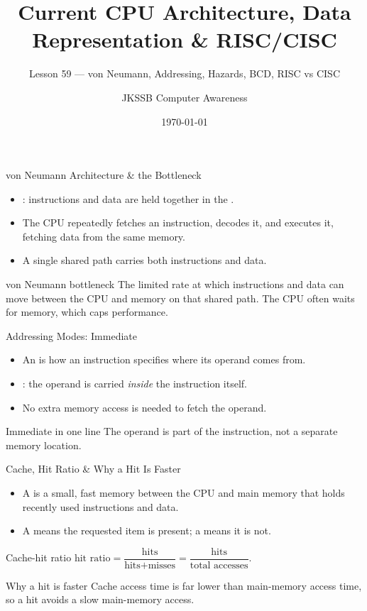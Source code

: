 \documentclass[aspectratio=169]{beamer}
\title{Current CPU Architecture, Data Representation \& RISC/CISC}
\subtitle{Lesson 59 --- von Neumann, Addressing, Hazards, BCD, RISC vs CISC}
\author{JKSSB Computer Awareness}
\date{\today}
\begin{document}
\frame{\titlepage}

\begin{frame}{von Neumann Architecture \& the Bottleneck}
  \begin{itemize}
    \item {}: instructions and
      data are held together in the .
    \item The CPU repeatedly fetches an instruction, decodes it, and executes
      it, fetching data from the same memory.
    \item A single shared path carries both instructions and data.
  \end{itemize}
  \begin{alertblock}{von Neumann bottleneck}
    The limited rate at which instructions and data can move between the CPU
    and memory on that shared path. The CPU often waits for memory, which
    caps performance.
  \end{alertblock}
\end{frame}

\begin{frame}{Addressing Modes: Immediate}
  \begin{itemize}
    \item An  is how an instruction specifies where its
      operand comes from.
    \item {}: the operand is carried \emph{inside}
      the instruction itself.
    \item No extra memory access is needed to fetch the operand.
  \end{itemize}
  \begin{block}{Immediate in one line}
    The operand is part of the instruction, not a separate memory location.
  \end{block}
\end{frame}

\begin{frame}{Cache, Hit Ratio \& Why a Hit Is Faster}
  \begin{itemize}
    \item A  is a small, fast memory between the CPU and main
      memory that holds recently used instructions and data.
    \item A  means the requested item is present; a  means
      it is not.
  \end{itemize}
  \begin{block}{Cache-hit ratio}
    $\text{hit ratio} = \dfrac{\text{hits}}{\text{hits} + \text{misses}}
    = \dfrac{\text{hits}}{\text{total accesses}}$.
  \end{block}
  \begin{alertblock}{Why a hit is faster}
    Cache access time is far lower than main-memory access time, so a hit
    avoids a slow main-memory access.
  \end{alertblock}
\end{frame}
\end{document}
